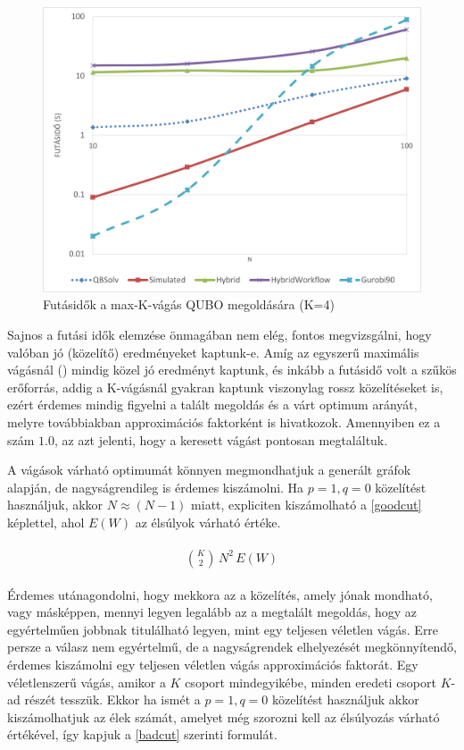 \begin{figure}[!ht]
	\centering
	\includegraphics[width=150mm, keepaspectratio]{figures/diagrams/maxKCutQUBO_K4.png}
	\caption{Futásidők a max-K-vágás QUBO megoldására (K=4)}
	\label{fig:maxKCutQUBO_K4}
\end{figure}

Sajnos a futási idők elemzése önmagában nem elég, fontos megvizsgálni, hogy valóban jó (közelítő) eredményeket kaptunk-e. Amíg az egyszerű maximális vágásnál () mindig közel jó eredményt kaptunk, és inkább a futásidő volt a szűkös erőforrás, addig a K-vágásnál gyakran kaptunk viszonylag rossz közelítéseket is, ezért érdemes mindig figyelni a talált megoldás és a várt optimum arányát, melyre továbbiakban approximációs faktorként is hivatkozok. Amennyiben ez a szám $1.0$, az azt jelenti, hogy a keresett vágást pontosan megtaláltuk.

A vágások várható optimumát könnyen megmondhatjuk a generált gráfok alapján, de nagyságrendileg is érdemes kiszámolni. Ha $p=1, q=0$ közelítést használjuk, akkor $N \approx (N-1)$ miatt, expliciten kiszámolható a \ref{goodcut} képlettel, ahol $E(W)$ az élsúlyok várható értéke.

\begin{align}
	\begin{split}
		\binom{K}{2} \, N^2 \, E(W) \label{goodcut}		
	\end{split}
\end{align}

Érdemes utánagondolni, hogy mekkora az a közelítés, amely jónak mondható, vagy másképpen, mennyi legyen legalább az a megtalált megoldás, hogy az egyértelműen jobbnak titulálható legyen, mint egy teljesen véletlen vágás. Erre persze a válasz nem egyértelmű, de a nagyságrendek elhelyezését megkönnyítendő, érdemes kiszámolni egy teljesen véletlen vágás approximációs faktorát. Egy véletlenszerű vágás, amikor a $K$ csoport mindegyikébe, minden eredeti csoport $K$-ad részét tesszük. Ekkor ha ismét a $p=1, q=0$ közelítést használjuk akkor kiszámolhatjuk az élek számát, amelyet még szorozni kell az élsúlyozás várható értékével, így kapjuk a \ref{badcut} szerinti formulát. 

